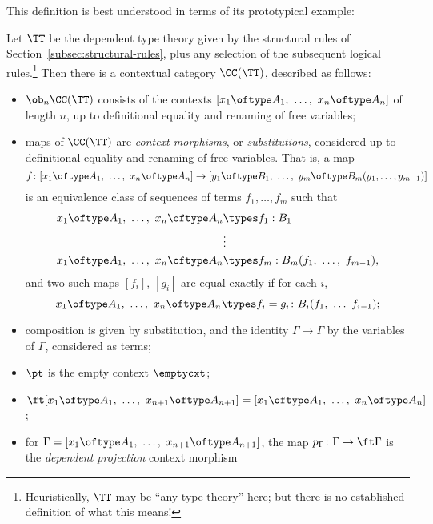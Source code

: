 This definition is best understood in terms of its prototypical example:

\begin{example}
Let $\TT$ be the dependent type theory given by the structural rules of Section~\ref{subsec:structural-rules}, plus any selection of the subsequent logical rules.\footnote{Heuristically, $\TT$ may be “any type theory” here; but there is no established definition of what this means!}  Then there is a contextual category $\CC(\TT)$, described as follows:
\begin{itemize}
\item $\ob_n \CC(\TT)$ consists of the contexts $[ x_1 \oftype A_1,\ \ldots,\ x_n \oftype A_n ]$ of length $n$, up to definitional equality and renaming of free variables;
\item maps of $\CC(\TT)$ are \emph{context morphisms}, or \emph{substitutions}, considered up to definitional equality and renaming of free variables.  That is, a map 
\[f \colon [ x_1 \oftype A_1,\ \ldots,\ x_n \oftype A_n] \to [ y_1 \oftype B_1,\ \ldots,\ y_m \oftype B_m(y_1, \ldots, y_{m-1}) ] \]
is an equivalence class of sequences of terms $f_1, \ldots, f_m$ such that
\begin{equation*}
\begin{split}
  x_1 \oftype A_1,\ \ldots,\ x_n \oftype A_n & \types f_1 : B_1 \\
  & \vdots  \\
  x_1 \oftype A_1,\ \ldots,\ x_n \oftype A_n & \types f_m : B_m(f_1,\ \ldots,\ f_{m-1}),
\end{split}
\end{equation*}
 and two such maps $[f_i]$, $[g_i]$ are equal exactly if for each $i$,
\[  x_1 \oftype A_1,\ \ldots,\ x_n \oftype A_n \types f_i = g_i \colon B_i(f_1,\ \ldots\ f_{i-1}); \]
\item composition is given by substitution, and the identity $\Gamma \to \Gamma$ by the variables of $\Gamma$, considered as terms;
\item $\pt$ is the empty context $\emptycxt$;
\item $\ft [ x_1 \oftype A_1,\ \ldots,\ x_{n+1} \oftype A_{n+1}] = [ x_1 \oftype A_1,\ \ldots,\ x_n \oftype A_n]$;
\item for $\Gamma = [ x_1 \oftype A_1,\ \ldots,\ x_{n+1} \oftype A_{n+1}]$, the map $p_\Gamma \colon \Gamma \to \ft \Gamma$ is the \emph{dependent projection} context morphism 

\end{itemize}
\end{example}
